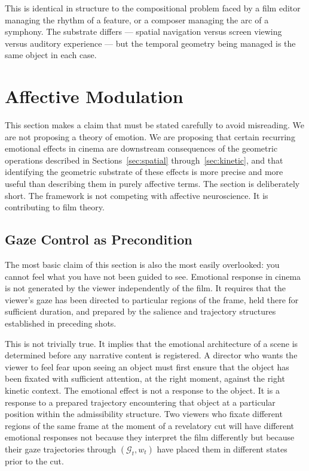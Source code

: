 \documentclass[12pt, a4paper]{article}
\theoremstyle{plain}
\theoremstyle{definition}
\theoremstyle{remark}
\newcommand{\G}{\mathcal{G}}
\newcommand{\salience}{w}
\begin{document}
This is identical in structure to the compositional problem
faced by a film editor managing the rhythm of a feature, or
a composer managing the arc of a symphony. The substrate
differs --- spatial navigation versus screen viewing versus
auditory experience --- but the temporal geometry being
managed is the same object in each case.

\section{Affective Modulation}
\label{sec:affect}

This section makes a claim that must be stated carefully to
avoid misreading. We are not proposing a theory of emotion.
We are proposing that certain recurring emotional effects in
cinema are downstream consequences of the geometric
operations described in Sections~\ref{sec:spatial}
through~\ref{sec:kinetic}, and that identifying the
geometric substrate of these effects is more precise and
more useful than describing them in purely affective terms.
The section is deliberately short. The framework is not
competing with affective neuroscience. It is contributing
to film theory.

\subsection{Gaze Control as Precondition}
\label{subsec:precondition}

The most basic claim of this section is also the most
easily overlooked: you cannot feel what you have not been
guided to see. Emotional response in cinema is not
generated by the viewer independently of the film. It
requires that the viewer's gaze has been directed to
particular regions of the frame, held there for sufficient
duration, and prepared by the salience and trajectory
structures established in preceding shots.

This is not trivially true. It implies that the emotional
architecture of a scene is determined before any narrative
content is registered. A director who wants the viewer to
feel fear upon seeing an object must first ensure that the
object has been fixated with sufficient attention, at the
right moment, against the right kinetic context. The
emotional effect is not a response to the object. It is a
response to a prepared trajectory encountering that object
at a particular position within the admissibility structure.
Two viewers who fixate different regions of the same frame
at the moment of a revelatory cut will have different
emotional responses not because they interpret the film
differently but because their gaze trajectories through
$(\G_t, \salience_t)$ have placed them in different states
prior to the cut.
\end{document}

